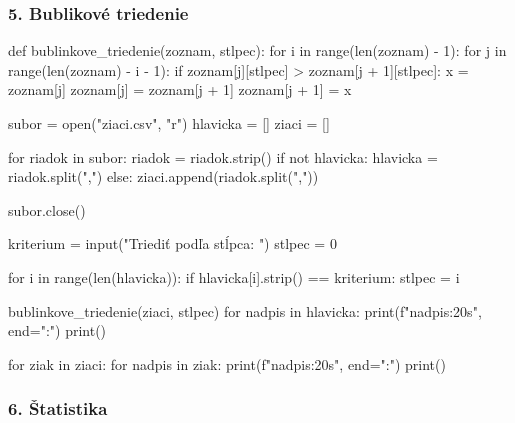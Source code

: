 \subsubsection*{5. Bublikové triedenie}

\begin{solution}
def bublinkove_triedenie(zoznam, stlpec):
    for i in range(len(zoznam) - 1):
        for j in range(len(zoznam) - i - 1):
            if zoznam[j][stlpec] > zoznam[j + 1][stlpec]:
                x = zoznam[j]
                zoznam[j] = zoznam[j + 1]
                zoznam[j + 1] = x


subor = open("ziaci.csv", "r")
hlavicka = []
ziaci = []

for riadok in subor:
    riadok = riadok.strip()
    if not hlavicka:
        hlavicka = riadok.split(",")
    else:
        ziaci.append(riadok.split(","))

subor.close()

kriterium = input("Triediť podľa stĺpca: ")
stlpec = 0

for i in range(len(hlavicka)):
    if hlavicka[i].strip() == kriterium:
        stlpec = i

bublinkove_triedenie(ziaci, stlpec)
for nadpis in hlavicka:
    print(f"{nadpis:20s}", end=":")
print()

for ziak in ziaci:
    for nadpis in ziak:
        print(f"{nadpis:20s}", end=":")
    print()
\end{solution}


\subsubsection*{6. Štatistika}

